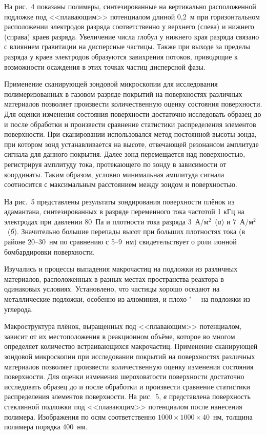 На рис.~4 показаны полимеры, синтезированные на вертикально
расположенной подложке под <<плавающим>> потенциалом длиной 0,2~м
при горизонтальном расположении электродов разряда соответственно
у верхнего (слева) и нижнего (справа) краев разряда. Увеличение
числа глобул у нижнего края разряда связано с влиянием гравитации
на дисперсные частицы. Также при выходе за пределы разряда у краев
электродов образуются завихрения потоков, приводящие к возможности
осаждения в этих точках частиц дисперсной фазы.

\smallskip

 Применение
сканирующей зондовой микроскопии для исследования полимеризованных
в газовом разряде покрытий на поверхностях различных материалов
позволяет произвести количественную оценку состояния поверхности.
Для оценки изменения состояния поверхности достаточно исследовать
образец до и после обработки и произвести сравнение статистики
распределения элементов поверхности. При сканировании
использовался метод постоянной высоты зонда, при котором зонд
устанавливается на высоте, отвечающей резонансом амплитуде сигнала
для данного покрытия. Далее зонд перемещается над поверхностью,
регистрируя амплитуду тока, протекающего по зонду в зависимости от
координаты. Таким образом, условно минимальная амплитуда сигнала
соотносится с максимальным расстоянием между зондом и
поверхностью.

На рис.~5 представлены результаты зондирования поверхности плёнок
из адамантана, синтезированных в разряде переменного тока частотой
1 кГц на электродах при давлении 80~Па и плотности тока разряда
3~А/м$^2$~({\sl а}) и 7~А/м$^2$~({\sl б}). Значительно большие
перепады высот при больших плотностях тока (в районе 20--30~нм по
сравнению с 5--9~нм) свидетельствует о роли ионной бомбардировки
поверхности.

Изучались и процессы выпадения макрочастиц на подложки из
различных материалов, расположенных в разных местах пространства
реактора в одинаковых условиях. Установлено, что частицы хорошо
оседают на металлические подложки, особенно из алюминия, и плохо
"--- на подложки из углерода.

\smallskip

 Макроструктура
плёнок, выращенных под <<плавающим>> потенциалом, зависит от их
местоположения в реакционном объёме, которое во многом определяет
количество встраивающихся макрочастиц. Применение сканирующей
зондовой микроскопии при исследовании покрытий на поверхностях
различных материалов позволяет произвести количественную оценку
изменения состояния поверхности. Для оценки изменения
шероховатости поверхности достаточно исследовать образец до и
после обработки и произвести сравнение статистики распределения
элементов поверхности. На рис.~5, {\sl в} представлена поверхность
стеклянной подложки под <<плавающим>> потенциалом после нанесения
полимера. Изображения по осям соответственно $1000 \times 1000
\times 40$~нм, толщина полимера порядка 400~нм.




